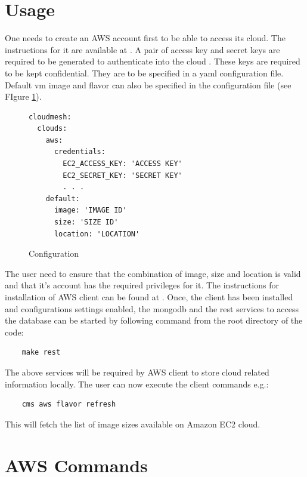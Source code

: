 \documentclass[9pt,twocolumn,twoside]{../../styles/osajnl}
\begin{document}
\section{Usage}

One needs to create an AWS account first to be able to access its
cloud. The instructions for it are available at
\cite{www-amazon-aws}. A pair of access key and secret keys are
required to be generated to authenticate into the cloud
\cite{www-amazon-key}. These keys are required to be kept
confidential. They are to be specified in a yaml configuration
file. Default vm image and flavor can also be specified in the
configuration file (see FIgure \ref{F:conf}). 

\begin{figure}[htb]
\begin{verbatim} 
cloudmesh:
  clouds:
    aws:
      credentials:
        EC2_ACCESS_KEY: 'ACCESS KEY'
        EC2_SECRET_KEY: 'SECRET KEY'
        . . .
    default:
      image: 'IMAGE ID'
      size: 'SIZE ID'
      location: 'LOCATION'
\end{verbatim}
\vspace{-1.0\baselineskip}
\caption{Configuration}\label{F:conf}
\end{figure}

The user need to ensure that the combination of image, size and
location is valid and that it's account has the required privileges
for it. The instructions for installation of AWS client can be found
at \cite{www-cloudmesh-aws}. Once, the client has been installed and
configurations settings enabled, the mongodb and the rest services to
access the database can be started by following command from the root
directory of the code:

\begin{verbatim}
    make rest
\end{verbatim}

The above services will be required by AWS client to store cloud
related information locally. The user can now execute the client
commands e.g.:

\begin{verbatim}
    cms aws flavor refresh
\end{verbatim}

This will fetch the list of image sizes available on Amazon EC2 cloud.

\section{AWS Commands}
\end{document}
